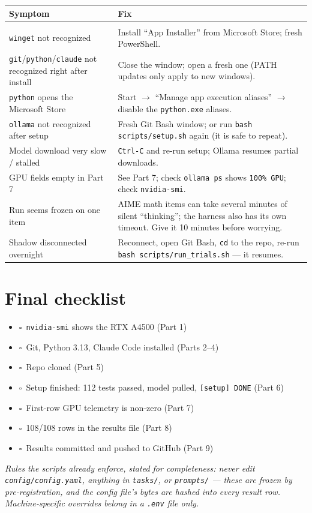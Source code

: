 \documentclass[11pt]{article}
\newcommand{\checkbox}{$\square$~}
\begin{document}
\begin{tabular}{p{2.6in}p{3.4in}}
\textbf{Symptom} & \textbf{Fix}\\[2pt]
\hline\\[-8pt]
\texttt{winget} not recognized & Install ``App Installer'' from Microsoft Store; fresh PowerShell.\\[4pt]
\texttt{git}/\texttt{python}/\texttt{claude} not recognized right after install & Close the window; open a fresh one (PATH updates only apply to new windows).\\[4pt]
\texttt{python} opens the Microsoft Store & Start $\rightarrow$ ``Manage app execution aliases'' $\rightarrow$ disable the \texttt{python.exe} aliases.\\[4pt]
\texttt{ollama} not recognized after setup & Fresh Git Bash window; or run \texttt{bash scripts/setup.sh} again (it is safe to repeat).\\[4pt]
Model download very slow / stalled & \texttt{Ctrl-C} and re-run setup; Ollama resumes partial downloads.\\[4pt]
GPU fields empty in Part 7 & See Part 7; check \texttt{ollama ps} shows \texttt{100\% GPU}; check \texttt{nvidia-smi}.\\[4pt]
Run seems frozen on one item & AIME math items can take several minutes of silent ``thinking''; the harness also has its own timeout. Give it 10 minutes before worrying.\\[4pt]
Shadow disconnected overnight & Reconnect, open Git Bash, \texttt{cd} to the repo, re-run \texttt{bash scripts/run\_trials.sh} --- it resumes.\\[4pt]
\end{tabular}

\vspace{1em}
\section*{Final checklist}

\begin{itemize}
  \item \checkbox \texttt{nvidia-smi} shows the RTX A4500 \hfill (Part 1)
  \item \checkbox Git, Python 3.13, Claude Code installed \hfill (Parts 2--4)
  \item \checkbox Repo cloned \hfill (Part 5)
  \item \checkbox Setup finished: 112 tests passed, model pulled, \texttt{[setup] DONE} \hfill (Part 6)
  \item \checkbox First-row GPU telemetry is non-zero \hfill (Part 7)
  \item \checkbox 108/108 rows in the results file \hfill (Part 8)
  \item \checkbox Results committed and pushed to GitHub \hfill (Part 9)
\end{itemize}

\textit{Rules the scripts already enforce, stated for completeness: never edit
\texttt{config/config.yaml}, anything in \texttt{tasks/}, or \texttt{prompts/} ---
these are frozen by pre-registration, and the config file's bytes are hashed into
every result row. Machine-specific overrides belong in a \texttt{.env} file only.}
\end{document}
